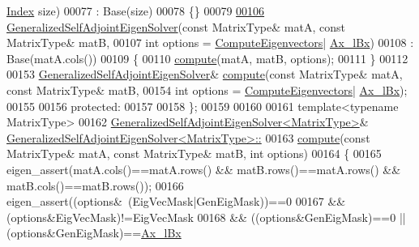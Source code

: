 \begin{DoxyCode}
      \hyperlink{group___eigenvalues___module_a8a59ab7734b6eae2754fd78bc7c3a360}{Index} size)
00077         : Base(size)
00078     \{\}
00079 
\hyperlink{group___eigenvalues___module_addc0409c9cb1a5ac9cbbd00efe68908e}{00106}     \hyperlink{group___eigenvalues___module_addc0409c9cb1a5ac9cbbd00efe68908e}{GeneralizedSelfAdjointEigenSolver}(\textcolor{keyword}{const} MatrixType& matA, \textcolor{keyword}{const} 
      MatrixType& matB,
00107                                       \textcolor{keywordtype}{int} options = \hyperlink{group__enums_ggae3e239fb70022eb8747994cf5d68b4a9ada93d8885bde32b876ba4af01d3292cc}{ComputeEigenvectors}|
      \hyperlink{group__enums_ggae3e239fb70022eb8747994cf5d68b4a9a1a7cefbb22c2c3928d246b753cf53633}{Ax\_lBx})
00108       : Base(matA.cols())
00109     \{
00110       \hyperlink{group___eigenvalues___module_a724764fe196612b752042692156ed023}{compute}(matA, matB, options);
00111     \}
00112 
00153     \hyperlink{group___eigenvalues___module_class_eigen_1_1_generalized_self_adjoint_eigen_solver}{GeneralizedSelfAdjointEigenSolver}& \hyperlink{group___eigenvalues___module_a724764fe196612b752042692156ed023}{compute}(\textcolor{keyword}{const} MatrixType& 
      matA, \textcolor{keyword}{const} MatrixType& matB,
00154                                                \textcolor{keywordtype}{int} options = \hyperlink{group__enums_ggae3e239fb70022eb8747994cf5d68b4a9ada93d8885bde32b876ba4af01d3292cc}{ComputeEigenvectors}|
      \hyperlink{group__enums_ggae3e239fb70022eb8747994cf5d68b4a9a1a7cefbb22c2c3928d246b753cf53633}{Ax\_lBx});
00155 
00156   \textcolor{keyword}{protected}:
00157 
00158 \};
00159 
00160 
00161 \textcolor{keyword}{template}<\textcolor{keyword}{typename} MatrixType>
00162 \hyperlink{group___eigenvalues___module_class_eigen_1_1_generalized_self_adjoint_eigen_solver}{GeneralizedSelfAdjointEigenSolver<MatrixType>}& 
      \hyperlink{group___eigenvalues___module_a724764fe196612b752042692156ed023}{GeneralizedSelfAdjointEigenSolver<MatrixType>::}
00163 \hyperlink{group___eigenvalues___module_a724764fe196612b752042692156ed023}{compute}(\textcolor{keyword}{const} MatrixType& matA, \textcolor{keyword}{const} MatrixType& matB, \textcolor{keywordtype}{int} options)
00164 \{
00165   eigen\_assert(matA.cols()==matA.rows() && matB.rows()==matA.rows() && matB.cols()==matB.rows());
00166   eigen\_assert((options&~(EigVecMask|GenEigMask))==0
00167           && (options&EigVecMask)!=EigVecMask
00168           && ((options&GenEigMask)==0 || (options&GenEigMask)==\hyperlink{group__enums_ggae3e239fb70022eb8747994cf5d68b4a9a1a7cefbb22c2c3928d246b753cf53633}{Ax\_lBx}

\end{DoxyCode}
